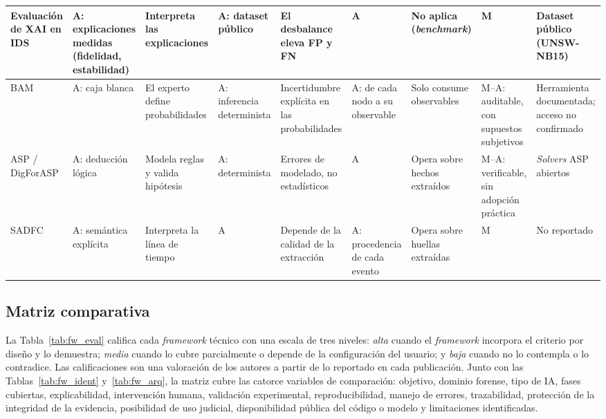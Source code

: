 \documentclass[journal]{IEEEtran}
\begin{document}
\begin{table}[!t]
\begin{tabular}{|L{1.7cm}|L{1.85cm}|L{1.85cm}|L{1.85cm}|L{1.9cm}|L{1.85cm}|L{1.85cm}|L{1.85cm}|L{1.8cm}|}
\hline
Evaluación de XAI en IDS & A: explicaciones medidas (fidelidad, estabilidad) & Interpreta las explicaciones & A: dataset público & El desbalance eleva FP y FN & A & No aplica (\textit{benchmark}) & M & Dataset público (UNSW-NB15) \\
\hline
BAM & A: caja blanca & El experto define probabilidades & A: inferencia determinista & Incertidumbre explícita en las probabilidades & A: de cada nodo a su observable & Solo consume observables & M--A: auditable, con supuestos subjetivos & Herramienta documentada; acceso no confirmado \\
\hline
ASP / DigForASP & A: deducción lógica & Modela reglas y valida hipótesis & A: determinista & Errores de modelado, no estadísticos & A & Opera sobre hechos extraídos & M--A: verificable, sin adopción práctica & \textit{Solvers} ASP abiertos \\
\hline
SADFC & A: semántica explícita & Interpreta la línea de tiempo & A & Depende de la calidad de la extracción & A: procedencia de cada evento & Opera sobre huellas extraídas & M & No reportado \\
\hline
\end{tabular}
\end{table}

\subsection{Matriz comparativa}
La Tabla~\ref{tab:fw_eval} califica cada \textit{framework} técnico con una escala de tres niveles: \textit{alta} cuando el \textit{framework} incorpora el criterio por diseño y lo demuestra; \textit{media} cuando lo cubre parcialmente o depende de la configuración del usuario; y \textit{baja} cuando no lo contempla o lo contradice. Las calificaciones son una valoración de los autores a partir de lo reportado en cada publicación. Junto con las Tablas~\ref{tab:fw_ident} y~\ref{tab:fw_arq}, la matriz cubre las catorce variables de comparación: objetivo, dominio forense, tipo de IA, fases cubiertas, explicabilidad, intervención humana, validación experimental, reproducibilidad, manejo de errores, trazabilidad, protección de la integridad de la evidencia, posibilidad de uso judicial, disponibilidad pública del código o modelo y limitaciones identificadas.
\end{document}
